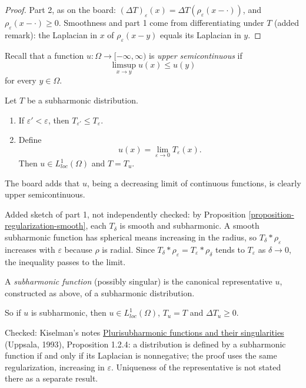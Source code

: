 \begin{proof}
Part 2, as on the board: $(\Delta
T)_\varepsilon(x)=\Delta
T(\rho_\varepsilon(x-\cdot))$, and
$\rho_\varepsilon(x-\cdot)\geq 0$. Smoothness
and part 1 come from differentiating under
$T$ (added remark): the Laplacian in $x$ of
$\rho_\varepsilon(x-y)$ equals its Laplacian
in $y$.
\end{proof}

\noindent
Recall that a function $u\colon\Omega\to
[-\infty,\infty)$ is \emph{upper
semicontinuous} if
$$
\limsup_{x\to y}u(x)\leq u(y)
$$
for every $y\in\Omega$.

\begin{theorem}
\label{theorem-canonical-representative}
Let $T$ be a subharmonic distribution.
\begin{enumerate}
\item If $\varepsilon'<\varepsilon$, then
$T_{\varepsilon'}\leq T_\varepsilon$.
\item Define
$$
u(x)=\lim_{\varepsilon\to 0}
T_\varepsilon(x).
$$
Then $u\in L^1_{loc}(\Omega)$ and $T=T_u$.
\end{enumerate}
\end{theorem}

\noindent
The board adds that $u$, being a decreasing
limit of continuous functions, is clearly
upper semicontinuous.

Added sketch of part 1, not independently
checked: by Proposition
\ref{proposition-regularization-smooth},
each $T_\delta$ is smooth and subharmonic. A
smooth subharmonic function has spherical
means increasing in the radius, so
$T_\delta*\rho_\varepsilon$ increases with
$\varepsilon$ because $\rho$ is radial. Since
$T_\delta*\rho_\varepsilon
=T_\varepsilon*\rho_\delta$ tends to
$T_\varepsilon$ as $\delta\to 0$, the
inequality passes to the limit.

\begin{definition}
\label{definition-singular-subharmonic}
A \emph{subharmonic function} (possibly
singular) is the canonical representative
$u$, constructed as above, of a subharmonic
distribution.
\end{definition}

\noindent
So if $u$ is subharmonic, then $u\in
L^1_{loc}(\Omega)$, $T_u=T$ and $\Delta
T_u\geq 0$.

Checked: Kiselman's notes
\href{%
https://user.it.uu.se/~cki26691/pluri0.pdf%
}{%
Plurisubharmonic functions and their
singularities} (Uppsala, 1993),
Proposition 1.2.4: a distribution is defined
by a subharmonic function if and only if its
Laplacian is nonnegative; the proof uses the
same regularization, increasing in
$\varepsilon$. Uniqueness of the
representative is not stated there as a
separate result.

